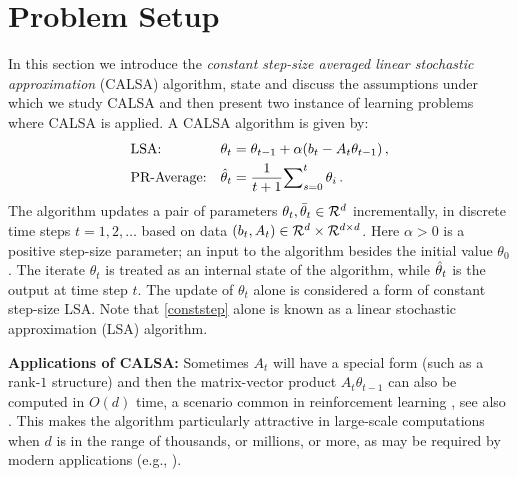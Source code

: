 \section{Problem Setup}\label{sec:prob}
In this section we introduce the \emph{constant step-size averaged linear stochastic approximation} (CALSA) algorithm, state and discuss the assumptions under which we study CALSA and then present two instance of learning problems where CALSA is applied. A  CALSA algorithm is given by:
\begin{subequations}\label{eq:lsa}
\begin{align}
\label{conststep}&\text{LSA:} &\theta_t&=\theta_{t-1}+\alpha(b_t-A_t\theta_{t-1})\,,\\
\label{iteravg}&\text{PR-Average:} &\hat{\theta}_t&=\frac{1}{t+1}{\sum}_{s=0}^{t}\,\theta_i\,.
\end{align}
\end{subequations}
The algorithm updates a pair of parameters $\theta_t,\bar{\theta}_t\in \mathcal{R}^{d}$ incrementally, in discrete time steps $t=1,2,\dots$
based on data $(b_t,A_t)\in \mathcal{R}^d\times\mathcal{R}^{d \times d}$. Here $\alpha>0$ is a positive step-size parameter; an input to the algorithm besides the
initial value $\theta_0$. The iterate $\theta_t$ is treated as an internal state of the algorithm, while $\hat{\theta}_t$ is the output at time step $t$. The update of $\theta_t$ alone is considered a form of constant step-size LSA. Note that \eqref{conststep} alone is known as a linear stochastic approximation (LSA) algorithm.

\textbf{Applications of CALSA:} Sometimes $A_t$ will have a special form (such as a rank-$1$ structure) and then the matrix-vector product $A_t \theta_{t-1}$ can also be computed in $O(d)$ time, a scenario common in reinforcement learning \cite{sutton,konda-tsitsiklis,gtd,gtd2,gtdmp}, see also . This makes the algorithm particularly attractive in large-scale computations when $d$ is in the range of thousands, or millions, or more, as may be required by modern applications (e.g., \citep{LiMaTaBo16}). 

